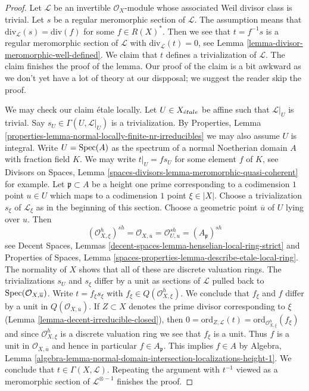 \begin{proof}
Let $\mathcal{L}$ be an invertible $\mathcal{O}_X$-module whose
associated Weil divisor class is trivial. Let $s$ be a regular
meromorphic section of $\mathcal{L}$. The assumption means that
$\text{div}_\mathcal{L}(s) = \text{div}(f)$ for some
$f \in R(X)^*$. Then we see that $t = f^{-1}s$ is a regular
meromorphic section of $\mathcal{L}$ with
$\text{div}_\mathcal{L}(t) = 0$, see
Lemma \ref{lemma-divisor-meromorphic-well-defined}.
We claim that $t$ defines a trivialization of $\mathcal{L}$.
The claim finishes the proof of the lemma.
Our proof of the claim is a bit awkward as we
don't yet have a lot of theory at our dispposal; we suggest
the reader skip the proof.

\medskip\noindent
We may check our claim \'etale locally. Let $U \in X_{\acute{e}tale}$ be affine
such that $\mathcal{L}|_U$ is trivial. Say $s_U \in \Gamma(U, \mathcal{L}|_U)$
is a trivialization. By
Properties, Lemma \ref{properties-lemma-normal-locally-finite-nr-irreducibles}
we may also assume $U$ is integral. Write $U = \mathop{\mathrm{Spec}}(A)$ as the spectrum of a
normal Noetherian domain $A$ with fraction field $K$.
We may write $t|_U = f s_U$ for some element $f$ of $K$, see
Divisors on Spaces, Lemma \ref{spaces-divisors-lemma-meromorphic-quasi-coherent}
for example. Let $\mathfrak p \subset A$ be a height one prime
corresponding to a codimension $1$ point $u \in U$ which maps
to a codimension $1$ point $\xi \in |X|$. Choose a trivialization
$s_\xi$ of $\mathcal{L}_\xi$ as in the beginning of this section.
Choose a geometric point $\overline{u}$ of $U$ lying over $u$.
Then
$$
(\mathcal{O}_{X, \xi}^h)^{sh} =
\mathcal{O}_{X, \overline{u}} =
\mathcal{O}_{U, u}^{sh} = (A_\mathfrak p)^{sh}
$$
see Decent Spaces, Lemmas
\ref{decent-spaces-lemma-henselian-local-ring-strict}
and
Properties of Spaces, Lemma
\ref{spaces-properties-lemma-describe-etale-local-ring}.
The normality of $X$ shows that all of these are
discrete valuation rings. The trivializations $s_U$ and $s_\xi$
differ by a unit as sections of $\mathcal{L}$ pulled back to
$\mathop{\mathrm{Spec}}(\mathcal{O}_{X, \overline{u}})$.
Write $t = f_\xi s_\xi$ with $f_\xi \in Q(\mathcal{O}_{X, \xi}^h)$.
We conclude that $f_\xi$ and $f$ differ by a unit
in $Q(\mathcal{O}_{X, \overline{u}})$.
If $Z \subset X$ denotes the prime divisor corresponding to $\xi$
(Lemma \ref{lemma-decent-irreducible-closed}), then
$0 = \text{ord}_{Z, \mathcal{L}}(t) =
\text{ord}_{\mathcal{O}_{X, \xi}^h}(f_\xi)$
and since $\mathcal{O}_{X, \xi}^h$ is a discrete valuation ring
we see that $f_\xi$ is a unit.
Thus $f$ is a unit in $\mathcal{O}_{X, \overline{u}}$
and hence in particular $f \in A_\mathfrak p$.
This implies $f \in A$ by Algebra, Lemma
\ref{algebra-lemma-normal-domain-intersection-localizations-height-1}.
We conclude that $t \in \Gamma(X, \mathcal{L})$.
Repeating the argument with $t^{-1}$ viewed as a meromorphic
section of $\mathcal{L}^{\otimes -1}$ finishes the proof.
\end{proof}

















